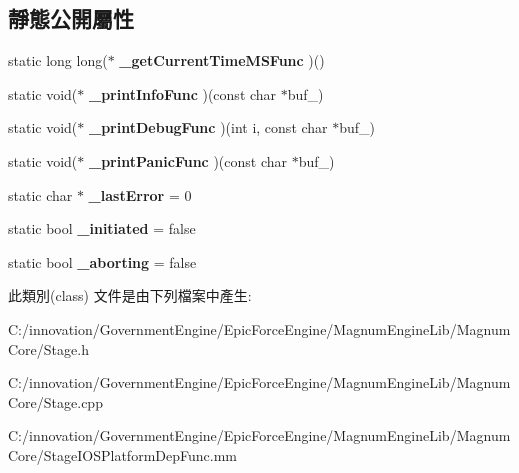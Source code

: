\subsection*{靜態公開屬性}
\begin{DoxyCompactItemize}
\item 
static long long($\ast$ {\bfseries \+\_\+get\+Current\+Time\+M\+S\+Func} )()\hypertarget{class_i_dream_sky_1_1_stage_a6c1017ed4ad8973f98869ac28f0ca553}{}\label{class_i_dream_sky_1_1_stage_a6c1017ed4ad8973f98869ac28f0ca553}

\item 
static void($\ast$ {\bfseries \+\_\+print\+Info\+Func} )(const char $\ast$buf\+\_\+)\hypertarget{class_i_dream_sky_1_1_stage_ae6f1c4c2c94cdcca022b2bacfe9f5e32}{}\label{class_i_dream_sky_1_1_stage_ae6f1c4c2c94cdcca022b2bacfe9f5e32}

\item 
static void($\ast$ {\bfseries \+\_\+print\+Debug\+Func} )(int i, const char $\ast$buf\+\_\+)\hypertarget{class_i_dream_sky_1_1_stage_a16fa2fd5176132ef4c2e278b3ac1f1b7}{}\label{class_i_dream_sky_1_1_stage_a16fa2fd5176132ef4c2e278b3ac1f1b7}

\item 
static void($\ast$ {\bfseries \+\_\+print\+Panic\+Func} )(const char $\ast$buf\+\_\+)\hypertarget{class_i_dream_sky_1_1_stage_a2580165ac0bc613bc5fda24177e13c97}{}\label{class_i_dream_sky_1_1_stage_a2580165ac0bc613bc5fda24177e13c97}

\item 
static char $\ast$ {\bfseries \+\_\+last\+Error} = 0\hypertarget{class_i_dream_sky_1_1_stage_a8758e8834c5abbcf323fa6c0e85d1051}{}\label{class_i_dream_sky_1_1_stage_a8758e8834c5abbcf323fa6c0e85d1051}

\item 
static bool {\bfseries \+\_\+initiated} = false\hypertarget{class_i_dream_sky_1_1_stage_a94da1d15ad34f8822fa99722b3cb6b8d}{}\label{class_i_dream_sky_1_1_stage_a94da1d15ad34f8822fa99722b3cb6b8d}

\item 
static bool {\bfseries \+\_\+aborting} = false\hypertarget{class_i_dream_sky_1_1_stage_a4c038691ca2088ca8c87d9c5dd4d63fd}{}\label{class_i_dream_sky_1_1_stage_a4c038691ca2088ca8c87d9c5dd4d63fd}

\end{DoxyCompactItemize}


此類別(class) 文件是由下列檔案中產生\+:\begin{DoxyCompactItemize}
\item 
C\+:/innovation/\+Government\+Engine/\+Epic\+Force\+Engine/\+Magnum\+Engine\+Lib/\+Magnum\+Core/Stage.\+h\item 
C\+:/innovation/\+Government\+Engine/\+Epic\+Force\+Engine/\+Magnum\+Engine\+Lib/\+Magnum\+Core/Stage.\+cpp\item 
C\+:/innovation/\+Government\+Engine/\+Epic\+Force\+Engine/\+Magnum\+Engine\+Lib/\+Magnum\+Core/Stage\+I\+O\+S\+Platform\+Dep\+Func.\+mm\end{DoxyCompactItemize}
